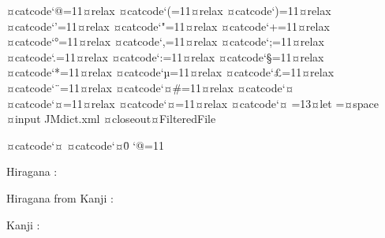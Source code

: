 


¤catcode`@=11¤relax
¤catcode`(=11¤relax
¤catcode`)=11¤relax
¤catcode`'=11¤relax
¤catcode`"=11¤relax
¤catcode`+=11¤relax
¤catcode`°=11¤relax
¤catcode`,=11¤relax
¤catcode`;=11¤relax
¤catcode`.=11¤relax
¤catcode`:=11¤relax
¤catcode`§=11¤relax
¤catcode`*=11¤relax
¤catcode`µ=11¤relax
¤catcode`£=11¤relax
¤catcode`¨=11¤relax
¤catcode`¤#=11¤relax
¤catcode`¤%
¤catcode`¤{=11¤relax
¤catcode`¤}=11¤relax
¤catcode`¤ =13¤let =¤space
¤input JMdict.xml
¤closeout¤FilteredFile

¤catcode`¤%
¤catcode`¤\=0\relax
\catcode`@=11\relax


\noindent
Hiragana : \the\HiraganaCount
\par\noindent
Hiragana from Kanji : \the\HiraganaFromKanjiCount 
\par\noindent
Kanji : \the\KanjiCount
\bye